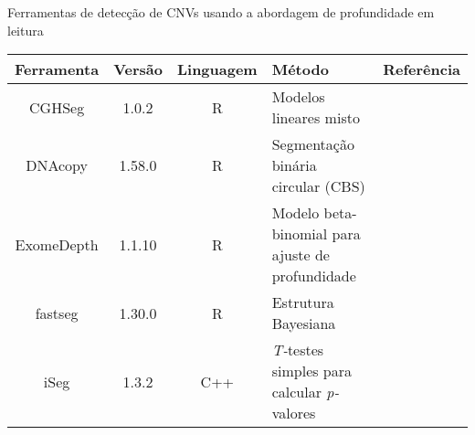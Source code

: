 \begin{quadro}[hbp]
\centering
\caption{Ferramentas de detecção de CNVs usando a abordagem de profundidade em leitura\label{qua:ferramentas-de-deteccao-de-cnv}}
    \begin{adjustbox}{max width=\textwidth}
    \begin{tabular}{ | c | c | c | p{5cm} | c | } \hline
        \textbf{Ferramenta}     & \textbf{Versão}       & \textbf{Linguagem}      & \textbf{Método}     & \textbf{Referência} \\ \hline
        CGHSeg & 1.0.2 & R & Modelos lineares misto & \cite{Picard2011} \\ \hline
        DNAcopy & 1.58.0 &  R & Segmentação binária circular (CBS) & \cite{Olshen2004} \\ \hline
        ExomeDepth & 1.1.10 & R & Modelo beta-binomial para ajuste de profundidade & \cite{Plagnol2012} \\ \hline
        fastseg & 1.30.0 & R & Estrutura Bayesiana & \cite{Baldi2001} \\ \hline
        iSeg & 1.3.2 & C++ & \textit{T-}testes simples para calcular \textit{p-}valores & \cite{Girimurugan2018} \\ \hline
    \end{tabular}
    \end{adjustbox}
\end{quadro}